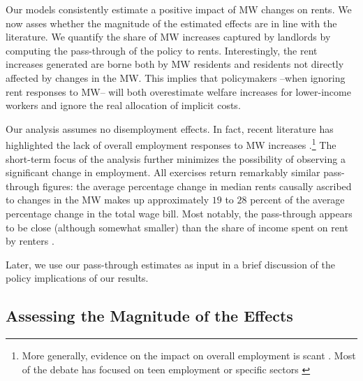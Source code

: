 
Our models consistently estimate a positive impact of MW changes on rents. We now 
asses whether the magnitude of the estimated effects are in line with the literature. 
We quantify the share of MW increases captured by landlords by computing the 
pass-through of the policy to rents. Interestingly, the rent increases generated are 
borne both by MW residents and residents not directly affected by changes in the MW.
This implies that policymakers --when ignoring rent responses to MW-- will both 
overestimate welfare increases for lower-income workers and ignore the real allocation 
of implicit costs. 

Our analysis assumes no disemployment effects. In fact, recent literature has highlighted 
the lack of overall employment responses to MW 
increases \parencite{CegnizEtAl2019}.\footnote{More generally, evidence on the impact on 
	overall employment is scant \parencite{dube2019impacts}. Most of the debate has focused 
	on teen employment \parencite{card1992using, allegretto2017credible} or specific sectors 
	\parencite{katz1992effect, card2000minimum, dube2010minimum}} 
The short-term focus of the analysis further minimizes the possibility of observing a 
significant change in employment. All exercises return remarkably similar pass-through 
figures: the average percentage change in median rents causally ascribed to changes in the 
MW makes up approximately $19$ to $28$ percent of the average percentage change in the total 
wage bill. Most notably, the pass-through appears to be close (although somewhat smaller) 
than the share of income spent on rent by renters \parencite{fernald2020americas}. 

Later, we use our pass-through estimates as input in a brief discussion of the policy 
implications of our results.

\subsection{Assessing the Magnitude of the Effects}\label{sec:discussion_benchmarking}

